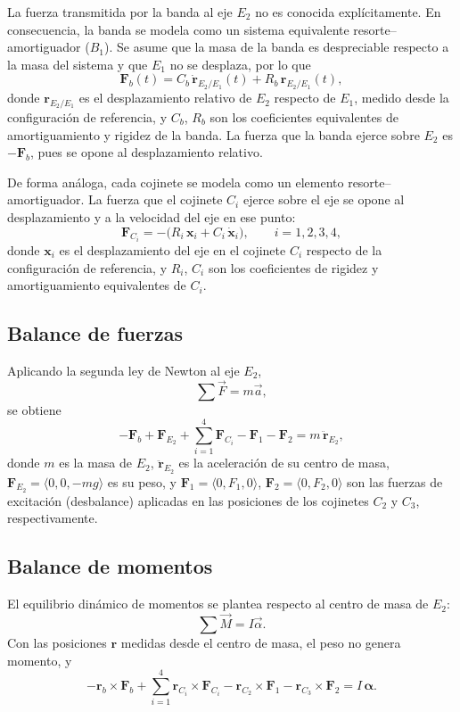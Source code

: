 La fuerza transmitida por la banda al eje $E_2$ no es conocida explícitamente. En consecuencia, la banda se modela 
como un sistema equivalente resorte--amortiguador ($B_1$). Se asume que la masa de la banda es despreciable respecto 
a la masa del sistema y que $E_1$ no se desplaza, por lo que
\[
\mathbf F_b(t)=C_b\,\dot{\mathbf r}_{E_2/E_1}(t)+R_b\,\mathbf r_{E_2/E_1}(t),
\]
donde $\mathbf r_{E_2/E_1}$ es el desplazamiento relativo de $E_2$ respecto de $E_1$, medido desde la configuración de 
referencia, y $C_b$, $R_b$ son los coeficientes equivalentes de amortiguamiento y rigidez de la banda. La fuerza que la 
banda ejerce sobre $E_2$ es $-\mathbf F_b$, pues se opone al desplazamiento relativo.

De forma análoga, cada cojinete se modela como un elemento resorte--amortiguador. La fuerza que el cojinete $C_i$ ejerce 
sobre el eje se opone al desplazamiento y a la velocidad del eje en ese punto:
\[
\mathbf F_{C_i}=-\big(R_i\,\mathbf x_i+C_i\,\dot{\mathbf x}_i\big),
\qquad i=1,2,3,4,
\]
donde $\mathbf x_i$ es el desplazamiento del eje en el cojinete $C_i$ respecto de la configuración de referencia, y 
$R_i$, $C_i$ son los coeficientes de rigidez y amortiguamiento equivalentes de $C_i$.

\subsection{Balance de fuerzas}

Aplicando la segunda ley de Newton al eje $E_2$,
\[
\sum\vec F=m\vec a,
\]
se obtiene
\[
-\mathbf F_b+\mathbf F_{E_2}+\sum_{i=1}^{4}\mathbf F_{C_i}-\mathbf F_1-\mathbf F_2=m\,\ddot{\mathbf r}_{E_2},
\]
donde $m$ es la masa de $E_2$, $\ddot{\mathbf r}_{E_2}$ es la aceleración de su centro de masa, 
$\mathbf F_{E_2}=\langle0,0,-mg\rangle$ es su peso, y $\mathbf F_1=\langle0,F_1,0\rangle$, 
$\mathbf F_2=\langle0,F_2,0\rangle$ son las fuerzas de excitación (desbalance) aplicadas en las 
posiciones de los cojinetes $C_2$ y $C_3$, respectivamente.

\subsection{Balance de momentos}

El equilibrio dinámico de momentos se plantea respecto al centro de masa de $E_2$:
\[
\sum\vec M=I\vec\alpha .
\]
Con las posiciones $\mathbf r$ medidas desde el centro de masa, el peso no genera momento, y
\[
-\mathbf r_b\times\mathbf F_b
+\sum_{i=1}^{4}\mathbf r_{C_i}\times\mathbf F_{C_i}
-\mathbf r_{C_2}\times\mathbf F_1
-\mathbf r_{C_3}\times\mathbf F_2
=I\,\boldsymbol\alpha .
\]

